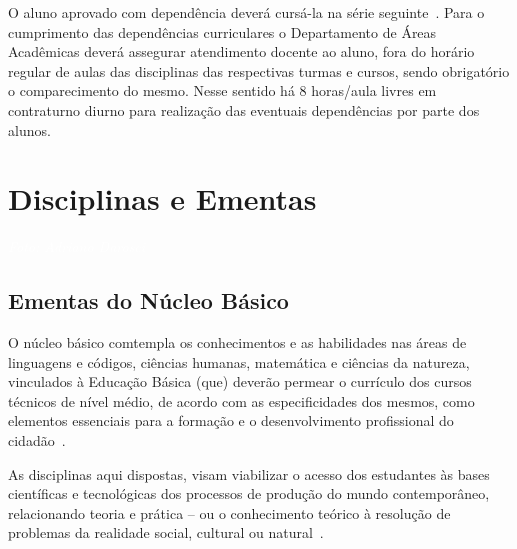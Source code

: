 \documentclass[11pt,fleqn]{book} %
\begin{document}
O aluno aprovado com dependência deverá cursá-la na série seguinte~\cite{Resolucao22De2011}.
Para o cumprimento das dependências curriculares o Departamento de Áreas Acadêmicas deverá assegurar atendimento docente ao aluno, fora do horário regular de aulas das disciplinas das respectivas turmas e cursos, sendo obrigatório o comparecimento do mesmo.
Nesse sentido há 8 horas/aula livres em contraturno diurno para realização das eventuais dependências por parte dos alunos.


\chapter{Disciplinas e Ementas}
\vspace{6em}
\begin{flushright}
	\textit{\textcolor{white}{Foto: Adriano Darosci}}
\end{flushright}
\vspace{12em}

\section{Ementas do Núcleo Básico}\label{ementasBasico}
\indent

O núcleo básico comtempla os conhecimentos e as habilidades nas áreas de linguagens e códigos, ciências humanas, matemática e ciências da natureza, vinculados à Educação Básica (que) deverão permear o currículo dos cursos técnicos de nível médio, de acordo com as especificidades dos mesmos, como elementos essenciais para a formação e o desenvolvimento profissional do cidadão~\cite{Resolucao06De2012}.

As disciplinas aqui dispostas, visam viabilizar o acesso dos estudantes às bases científicas e tecnológicas dos processos de produção do mundo contemporâneo, relacionando teoria e prática – ou o conhecimento teórico à resolução de problemas da realidade social, cultural ou natural~\cite{BNCC2019}.

\newpage
\end{document}
